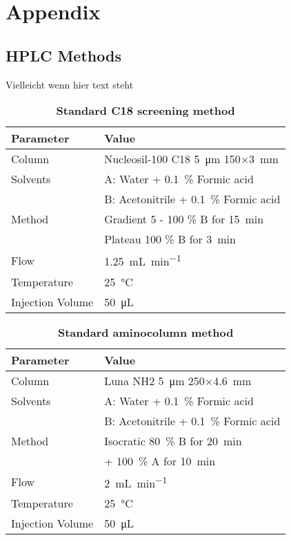 
\chapter{Appendix}

\section{HPLC Methods} %
\label{sec:hplc_methods}

	Vielleicht wenn hier text steht

	\begin{table}[htbp]
		\caption[Standard C18 screening method]{\textbf{Standard C18 screening method}}
		\label{tab:method_c18_screening}
		\centering
		\begin{tabularx}{\textwidth}{XX}
			\toprule
			\textbf{Parameter}	& \textbf{Value}	\\
			\midrule
			Column 		& Nucleosil-100 C18 \SI{5}{\micro\meter} 150$\times$\SI{3}{\milli\meter} 	\\
			Solvents	& A: Water + 0.1~\% Formic acid 	\\
						& B: Acetonitrile + 0.1~\% Formic acid		\\
			Method 		& Gradient 5 - 100 \% B for \SI{15}{\minute} 	\\
						& Plateau 100 \% B for \SI{3}{\minute} 	\\
			Flow 		& \SI{1.25}{\milli\liter\per\minute} \\
			Temperature & \SI{25}{\celsius} 	\\
			Injection Volume 	& \SI{50}{\micro\liter} 	\\
			\bottomrule
		\end{tabularx}
	\end{table}

	\begin{table}[htbp]
		\caption[Standard aminocolumn method]{\textbf{Standard aminocolumn method}}
		\label{tab:method_nh2_standard}
		\centering
		\begin{tabularx}{\textwidth}{XX}
			\toprule
			\textbf{Parameter}	& \textbf{Value}	\\
			\midrule
			Column 		& Luna NH2 \SI{5}{\micro\meter} 250$\times$\SI{4.6}{\milli\meter} 	\\
			Solvents	& A: Water + 0.1~\% Formic acid 	\\
						& B: Acetonitrile + 0.1~\% Formic acid		\\
			Method 		& Isocratic 80~\% B for \SI{20}{\minute} 	\\
						& + 100~\% A for \SI{10}{\minute}   \\
			Flow 		& \SI{2}{\milli\liter\per\minute} \\
			Temperature & \SI{25}{\celsius} 	\\
			Injection Volume 	& \SI{50}{\micro\liter} 	\\
			\bottomrule
		\end{tabularx}
	\end{table}

